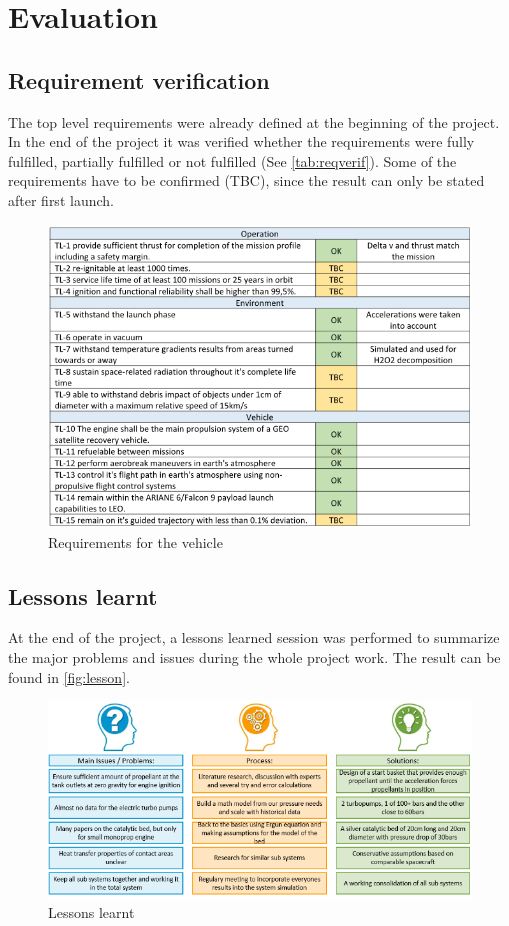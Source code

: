 \chapter{Evaluation}
\section{Requirement verification}
The top level requirements were already defined at the beginning of the project. In the end of the project it was verified whether the requirements were fully fulfilled, partially fulfilled or not fulfilled (See \autoref{tab:reqverif}). Some of the requirements have to be confirmed (TBC), since the result can only be stated after first launch.
\begin{figure}[H]
	\centering
	\includegraphics[width=0.85\linewidth]{reqveh}
	\caption{Requirements for the vehicle}\label{tab:reqverif}
\end{figure}

\section{Lessons learnt}
At the end of the project, a lessons learned session was performed to summarize the major problems and issues
during the whole project work. The result can be found in \autoref{fig:lesson}.
\begin{figure}[H]
	\centering
	\includegraphics[width=\linewidth]{lessonlearnt}
	\caption{Lessons learnt}\label{fig:lesson}
\end{figure}